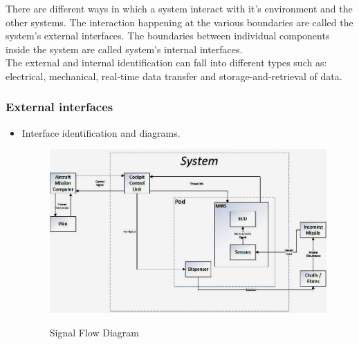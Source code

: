 There are different ways in which a system interact with it's environment and the other systems. The interaction happening at the various boundaries are called the system's external interfaces. The boundaries between individual components inside the system are called system's internal interfaces.\\
The external and internal identification can fall into different types such as: electrical, mechanical, real-time data transfer and storage-and-retrieval of data.

\subsubsection{External interfaces}
\begin{itemize}
\item {Interface identification and diagrams.}\\
\begin{figure}[h]
	\centering
	\includegraphics[scale=0.5]{./images/SignalFlowDiagram}\\
	\caption{Signal Flow Diagram}
    \label{fig:sigFlowDiagram}
\end{figure}


\end{itemize}
